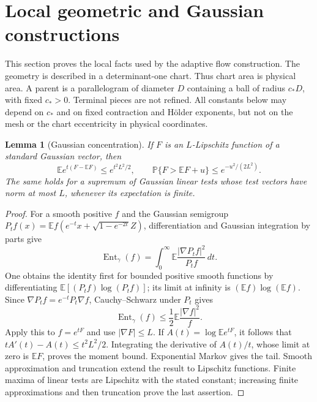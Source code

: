 \documentclass[11pt]{article}
\newtheorem{lemma}[theorem]{Lemma}
\newcommand{\E}{\mathbb E}
\newcommand{\PP}{\mathbb P}
\numberwithin{equation}{section}
\begin{document}



\section{Local geometric and Gaussian constructions}
\label{sec:selfcontained-local-tools}

This section proves the local facts used by the adaptive flow construction.
The geometry is described in a determinant-one chart. Thus chart area is
physical area. A parent is a parallelogram of diameter $D$ containing a
ball of radius $c_*D$, with fixed $c_*>0$. Terminal pieces are not refined.
All constants below may depend on $c_*$ and on fixed contraction and
H\"older exponents, but not on the mesh or the chart eccentricity in
physical coordinates.

\begin{lemma}[Gaussian concentration]\label{lem:local-gaussian-concentration}
If $F$ is an $L$-Lipschitz function of a standard Gaussian vector, then
\[
 \E e^{t(F-\E F)}\le e^{t^2L^2/2},\qquad
 \PP\{F>\E F+u\}\le e^{-u^2/(2L^2)}.
\]
The same holds for a supremum of Gaussian linear tests whose test vectors
have norm at most $L$, whenever its expectation is finite.
\end{lemma}
\begin{proof}
For a smooth positive $f$ and the Gaussian semigroup
$P_tf(x)=\E f(e^{-t}x+\sqrt{1-e^{-2t}}Z)$, differentiation and Gaussian
integration by parts give
\[
 \operatorname{Ent}_\gamma(f)
 =\int_0^\infty\E\frac{|\nabla P_tf|^2}{P_tf}\,dt.
\]
One obtains the identity first for bounded positive smooth functions by
differentiating $\E[(P_tf)\log(P_tf)]$; its limit at infinity is
$(\E f)\log(\E f)$. Since
$\nabla P_tf=e^{-t}P_t\nabla f$, Cauchy--Schwarz under $P_t$ gives
\[
 \operatorname{Ent}_\gamma(f)
 \le\frac12\E\frac{|\nabla f|^2}{f}.
\]
Apply this to $f=e^{tF}$ and use $|\nabla F|\le L$. If
$A(t)=\log\E e^{tF}$, it follows that
$tA'(t)-A(t)\le t^2L^2/2$. Integrating the derivative of $A(t)/t$,
whose limit at zero is $\E F$, proves the moment bound. Exponential
Markov gives the tail. Smooth approximation and truncation extend the
result to Lipschitz functions. Finite maxima of linear tests are
Lipschitz with the stated constant; increasing finite approximations
and then truncation prove the last assertion.
\end{proof}
\end{document}
